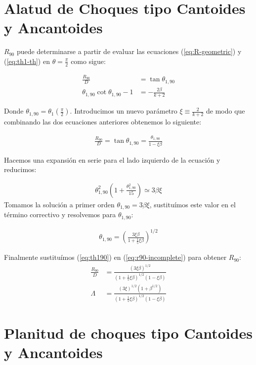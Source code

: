 \section[Alatud]{Alatud de Choques tipo Cantoides y Ancantoides}
$R_{90}$ puede determinarse a partir de evaluar las ecuaciones (\ref{eq:R-geometric}) y (\ref{eq:th1-th}) en $\theta=\frac{\pi}{2}$
como sigue:

\begin{align}
  \frac{R_{90}}{D} &= \tan\theta_{1,90} \\
  \theta_{1,90}\cot\theta_{1,90} -1 &=  - \frac{2\beta}{k+2}
\end{align}

Donde $\theta_{1,90} = \theta_1\left(\frac{\pi}{2}\right)$. Introducimos un nuevo parámetro $\xi \equiv \frac{2}{k+2}$ de modo que
combinando las dos ecuaciones anteriores obtenemos lo siguiente:

\begin{align}
  \frac{R_{90}}{D} = \tan\theta_{1,90} = \frac{\theta_{1,90}}{1-\xi\beta} \label{eq:r90-incomplete}
\end{align}

Hacemos una expansión en serie para el lado izquierdo de la ecuación y reducimos:

\begin{align}
  \theta^2_{1,90}\left(1 + \frac{\theta^2_{1,90}}{15}\right) \simeq 3\beta\xi
\end{align}
Tomamos la solución a primer orden $\theta_{1,90} = 3\beta\xi$,  sustituímos este valor en el término correctivo y resolvemos para
$\theta_{1,90}$:

\begin{align}
  \theta_{1,90} = \left(\frac{3\xi\beta}{1+\frac{1}{5}\xi\beta}\right)^{1/2} \label{eq:th190}
\end{align}

Finalmente sustituímos (\ref{eq:th190}) en (\ref{eq:r90-incomplete}) para obtener $R_{90}$:
\begin{align}
  \frac{R_{90}}{D} &= \frac{\left(3\xi\beta\right)^{1/2}}{\left(1+\frac{1}{5}\xi\beta\right)^{1/2}\left(1-\xi\beta\right)} \\
  \Lambda &= \frac{\left(3\xi\right)^{1/2}\left(1+\beta^{1/2}\right)}
                   {\left(1+\frac{1}{5}\xi\beta\right)^{1/2}\left(1-\xi\beta\right)} 
\end{align}

\section[Planitud]{Planitud de choques tipo Cantoides y Ancantoides}

